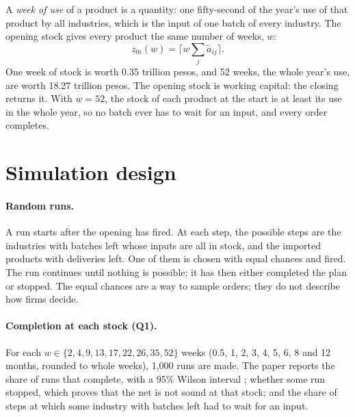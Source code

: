 \documentclass[11pt]{article}
\begin{document}
A \emph{week of use} of a product is a quantity: one fifty-second of the year's use of that product by all industries, which is the input of one batch of every industry. The opening stock gives every product the same number of weeks, $w$:
\begin{equation}
z_{0i}(w)=\Big\lceil w\textstyle\sum_j\tilde a_{ij}\Big\rceil .
\label{eq:stock}
\end{equation}
One week of stock is worth 0.35 trillion pesos, and 52 weeks, the whole year's use, are worth 18.27 trillion pesos. The opening stock is working capital: the closing returns it. With $w=52$, the stock of each product at the start is at least its use in the whole year, so no batch ever has to wait for an input, and every order completes.

\section{Simulation design}\label{sec:sim}

\paragraph{Random runs.} A run starts after the opening has fired. At each step, the possible steps are the industries with batches left whose inputs are all in stock, and the imported products with deliveries left. One of them is chosen with equal chances and fired. The run continues until nothing is possible; it has then either completed the plan or stopped. The equal chances are a way to sample orders; they do not describe how firms decide.

\paragraph{Completion at each stock (Q1).} For each $w\in\{2,4,9,13,17,22,26,35,52\}$ weeks (0.5, 1, 2, 3, 4, 5, 6, 8 and 12 months, rounded to whole weeks), 1{,}000 runs are made. The paper reports the share of runs that complete, with a 95\% Wilson interval \citep{Wilson1927}; whether some run stopped, which proves that the net is not sound at that stock; and the share of steps at which some industry with batches left had to wait for an input.
\end{document}
